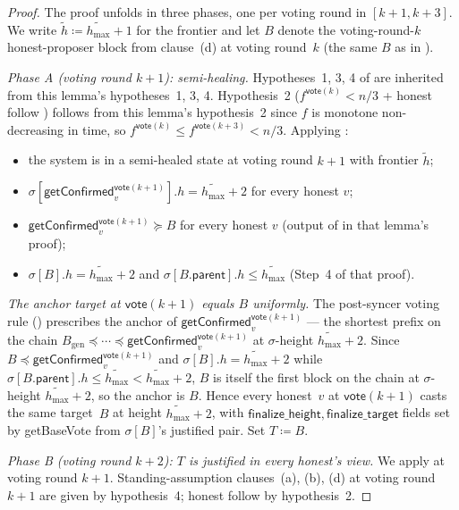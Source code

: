 \ifx\litemode\undefined\documentclass{article}\fi
\newcommand{\genesis}{\ensuremath{B_{\mathrm{gen}}}}
\newcommand{\parent}{\mathsf{parent}}
\newcommand{\finalizeHeight}{\mathsf{finalize\_height}}
\newcommand{\finalizeTarget}{\mathsf{finalize\_target}}
\newcommand{\hmax}{\ensuremath{h_{\max}}\xspace}
\newcommand{\vote}{\ensuremath{\mathsf{vote}}}
\newcommand{\comm}[1]{\ensuremath{\widetilde{#1}}}
\newcommand{\getBaseVote}{\textsf{getBaseVote}\xspace}
\newcommand{\getConfirmed}{\textsf{getConfirmed}\xspace}
\theoremstyle{plain}
\theoremstyle{definition}
\theoremstyle{remark}
\begin{document}
\begin{proof}
The proof unfolds in three phases, one per voting round in $[k+1, k+3]$. We write $\comm{h} \coloneqq \comm{\hmax}+1$ for the frontier and let $B$ denote the voting-round-$k$ honest-proposer block from clause~(d) at voting round~$k$ (the same $B$ as in ).

\medskip
\noindent\emph{Phase A (voting round $k+1$): semi-healing.}
Hypotheses~1, 3, 4 of  are inherited from this lemma's hypotheses~1, 3, 4. Hypothesis~2 ($f^{\vote(k)} < n/3$ + honest follow ) follows from this lemma's hypothesis~2 since $f$ is monotone non-decreasing in time, so $f^{\vote(k)} \leq f^{\vote(k+3)} < n/3$. Applying :
\begin{itemize}
  \item the system is in a semi-healed state at voting round $k+1$ with frontier $\comm{h}$;
  \item $\sigma[\getConfirmed_v^{\vote(k+1)}].h = \comm{\hmax}+2$ for every honest $v$;
  \item $\getConfirmed_v^{\vote(k+1)} \succeq B$ for every honest $v$ (output of  in that lemma's proof);
  \item $\sigma[B].h = \comm{\hmax}+2$ and $\sigma[B.\parent].h \leq \comm{\hmax}$ (Step~4 of that proof).
\end{itemize}

\emph{The anchor target at $\vote(k+1)$ equals $B$ uniformly.}
The post-syncer voting rule () prescribes the anchor of $\getConfirmed_v^{\vote(k+1)}$ --- the shortest prefix on the chain $\genesis \preceq \cdots \preceq \getConfirmed_v^{\vote(k+1)}$ at $\sigma$-height $\comm{\hmax}+2$. Since $B \preceq \getConfirmed_v^{\vote(k+1)}$ and $\sigma[B].h = \comm{\hmax}+2$ while $\sigma[B.\parent].h \leq \comm{\hmax} < \comm{\hmax}+2$, $B$ is itself the first block on the chain at $\sigma$-height $\comm{\hmax}+2$, so the anchor is $B$. Hence every honest~$v$ at $\vote(k+1)$ casts the same target~$B$ at height $\comm{\hmax}+2$, with $\finalizeHeight, \finalizeTarget$ fields set by \getBaseVote{} from $\sigma[B]$'s justified pair. Set $T \coloneqq B$.

\medskip
\noindent\emph{Phase B (voting round $k+2$): $T$ is justified in every honest's view.}
We apply  at voting round $k+1$. Standing-assumption clauses~(a), (b), (d) at voting round $k+1$ are given by hypothesis~4; honest follow  by hypothesis~2.


\end{proof}
\end{document}
